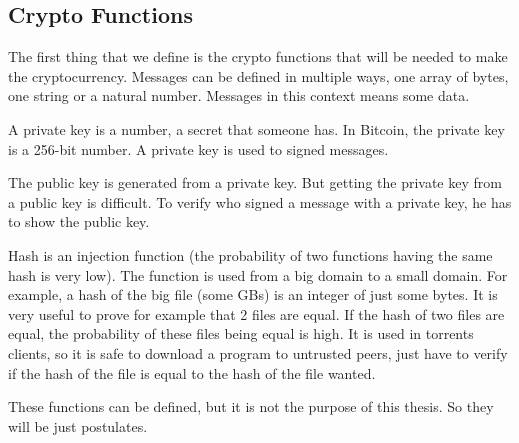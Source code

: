 \subsection{Crypto Functions}
The first thing that we define is the crypto functions that will be needed to make the cryptocurrency.
Messages can be defined in multiple ways, one array of bytes, one string or a natural number.
Messages in this context means some data.

A private key is a number, a secret that someone has.
In Bitcoin, the private key is a 256-bit number.
A private key is used to signed messages.

The public key is generated from a private key.
But getting the private key from a public key is difficult.
To verify who signed a message with a private key, he has to show the public key.

Hash is an injection function (the probability of two functions having the same hash is very low).
The function is used from a big domain to a small domain.
For example, a hash of the big file (some GBs) is an integer of just some bytes.
It is very useful to prove for example that 2 files are equal.
If the hash of two files are equal, the probability of these files being equal is high.
It is used in torrents clients, so it is safe to download a program to untrusted peers,
just have to verify if the hash of the file is equal to the hash of the file wanted.

These functions can be defined, but it is not the purpose of this thesis.
So they will be just postulates.

